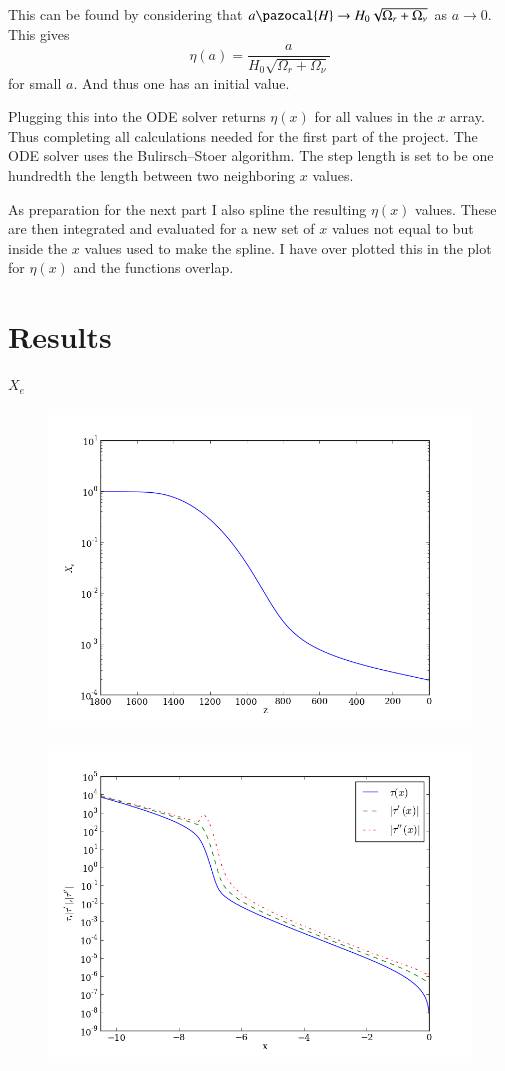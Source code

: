 \documentclass{aa}   %
\begin{document}
This can be found by considering that $a\pazocal{H} \rightarrow  H_0\sqrt{\Omega_r+\Omega_\nu}$ as $a \rightarrow 0$. This gives 
\begin{equation}
 \eta(a) = \frac{a}{H_0\sqrt{\Omega_r+\Omega_\nu}}
\end{equation}
for small $a$. And thus one has an initial value.

Plugging this into the ODE solver returns $\eta(x)$ for all values in the $x$ array. Thus completing all calculations needed for the first part of the project. The ODE solver uses the Bulirsch–Stoer algorithm. The step length is set to be one hundredth the length between two neighboring $x$ values.

As preparation for the next part I also spline the resulting $\eta(x)$ values. These are then integrated and evaluated for a new set of $x$ values not equal to but inside the $x$ values used to make the spline. I have over plotted this in the plot for $\eta(x)$ and the functions overlap. 

\section{Results}\label{sec:simulate_analytic}

$X_e$

  \begin{figure}[ht]
   \includegraphics[width=.49\textwidth]{X_e.png}
   \caption{}
  \label{figure0}
  \end{figure}

 
   \begin{figure}[ht]
   \includegraphics[width=.49\textwidth]{tau.png}
   \caption{}
  \label{figure1}
  \end{figure}
 
\end{document}
